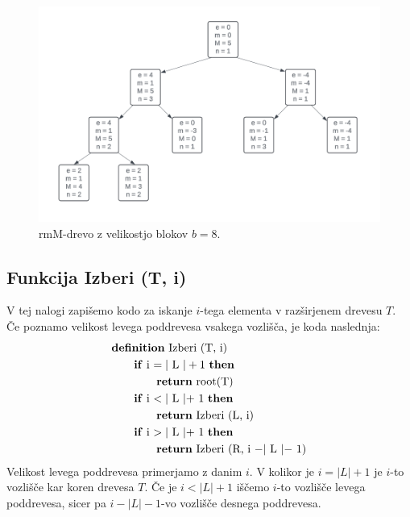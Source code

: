 \documentclass{article}
\begin{document}
\begin{figure}[h]
    \centering
    \includegraphics[width=0.9\linewidth]{rmm.png}
    \caption{rmM-drevo z velikostjo blokov $b = 8$.}
\end{figure}

\subsection*{Funkcija {\selectfont Izberi (T, i)}}
V tej nalogi zapišemo kodo za iskanje $i$-tega elementa v razširjenem drevesu $T$. Če poznamo velikost levega poddrevesa vsakega vozlišča, je koda naslednja:
\begin{align*}
    &\text{\textbf{definition} Izberi (T, i)} \\
    &\qquad \text{\textbf{if} i $= |$ L $| + 1$ \textbf{then}} \\
    &\qquad \qquad \text{\textbf{return} root(T)}  \\
    &\qquad \text{\textbf{if} i $< |$ L $| +$ 1 \textbf{then}} \\
    &\qquad \qquad \text{\textbf{return} Izberi (L, i)} \\
    &\qquad \text{\textbf{if} i $> |$ L $| +$ 1 \textbf{then}} \\
    &\qquad \qquad \text{\textbf{return} Izberi (R, i $- |$ L $| -$ 1)}   
\end{align*}
Velikost levega poddrevesa primerjamo z danim $i$. V kolikor je $i = |L| + 1$ je $i$-to vozlišče kar koren drevesa $T$.
Če je $i < |L| + 1$ iščemo $i$-to vozlišče levega poddrevesa, sicer pa $i - |L| - 1$-vo vozlišče desnega poddrevesa.
\end{document}
